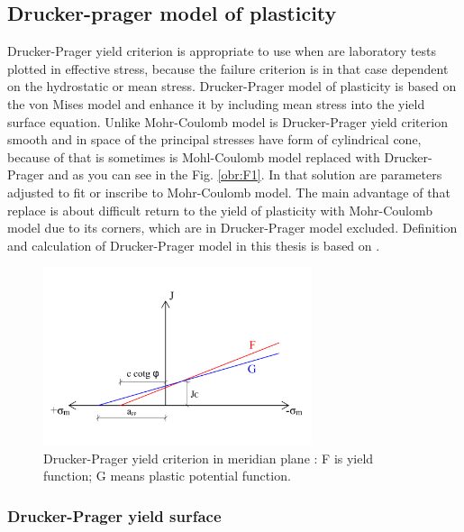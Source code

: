 \subsection{Drucker-prager model of plasticity}\label{sec:drucker-prager_introduction}
\indent

Drucker-Prager yield criterion is appropriate to use when are laboratory tests plotted in effective stress, because the failure criterion is in that case dependent on the hydrostatic or mean stress. Drucker-Prager model of plasticity is based on the von Mises model and enhance it by including mean stress into the yield surface equation. Unlike Mohr-Coulomb model is Drucker-Prager yield criterion smooth and in space of the principal stresses have form of cylindrical cone, because of that is sometimes is Mohl-Coulomb model replaced with Drucker-Prager and as you can see in the Fig. \ref{obr:F1}. In that solution are parameters adjusted to fit or inscribe to Mohr-Coulomb model. The main advantage of that replace is about difficult return to the yield of plasticity with Mohr-Coulomb model due to its corners, which are in Drucker-Prager model excluded. Definition and calculation of Drucker-Prager model in this thesis is based on \cite{geofem}.   

\begin{figure}[h!]
	\centering	
	\includegraphics[width=0.7\textwidth, angle=0]{obrazky/drucker_prager_meridian_my.png}
	\caption[Drucker-Prager yield criterion on meridian plane $T$]{Drucker-Prager yield criterion in meridian plane \cite{geofem}: F is yield function; G means plastic potential function.} \label{obr:M1}
\end{figure}

\subsubsection{Drucker-Prager yield surface}\label{sec:drucker-prager_yield_criterion}
\indent

